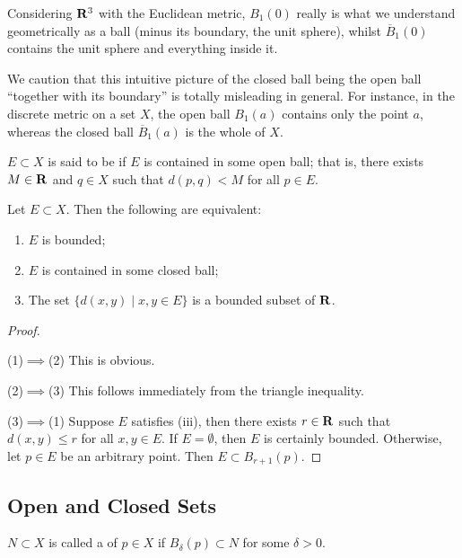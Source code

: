 \begin{example}
Considering $\mathbf R^3$ with the Euclidean metric, $B_1(0)$ really is what we understand geometrically as a ball (minus its boundary, the unit sphere), whilst $\overline{B}_1(0)$ contains the unit sphere and everything inside it.
\end{example}

\begin{remark}
We caution that this intuitive picture of the closed ball being the open ball ``together with its boundary'' is totally misleading in general. For instance, in the discrete metric on a set $X$, the open ball $B_1(a)$ contains only the point $a$, whereas the closed ball $\overline{B}_1(a)$ is the whole of $X$.
\end{remark}

\begin{definition}[Bounded]
$E\subset X$ is said to be  if $E$ is contained in some open ball; that is, there exists $M\in\mathbf R$ and $q\in X$ such that $d(p,q)<M$ for all $p\in E$.
\end{definition}

\begin{proposition}
Let $E\subset X$. Then the following are equivalent:
\begin{enumerate}[label=(\roman*)]
\item $E$ is bounded;
\item $E$ is contained in some closed ball;
\item The set $\{d(x,y)\mid x,y\in E\}$ is a bounded subset of $\mathbf R$.
\end{enumerate}
\end{proposition}

\begin{proof} \

(1)$\implies$(2) This is obvious.

(2)$\implies$(3) This follows immediately from the triangle inequality.

(3)$\implies$(1) Suppose $E$ satisfies (iii), then there exists $r\in\mathbf R$ such that $d(x,y)\le r$ for all $x,y\in E$. If $E=\emptyset$, then $E$ is certainly bounded. Otherwise, let $p\in E$ be an arbitrary point. Then $E\subset B_{r+1}(p)$.
\end{proof}

\subsection{Open and Closed Sets}
\begin{definition}[Neighbourhood]
$N\subset X$ is called a  of $p\in X$ if $B_\delta(p)\subset N$ for some $\delta>0$.
\end{definition}


